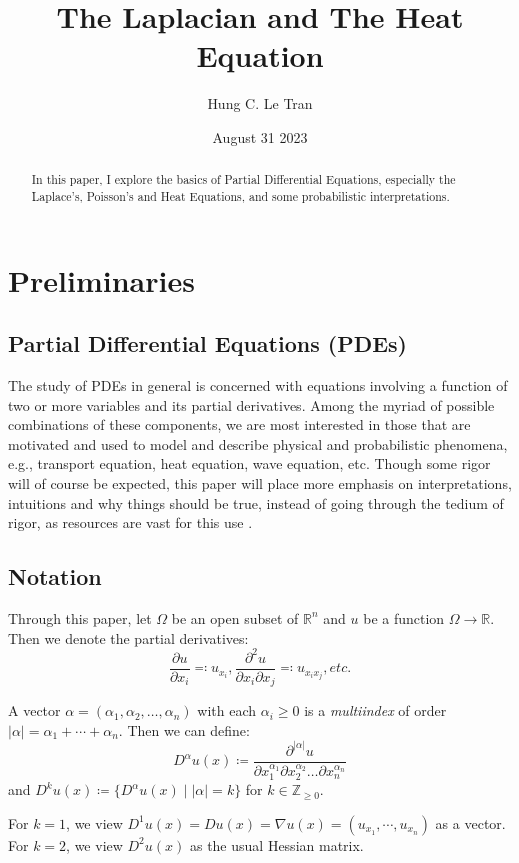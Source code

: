 \documentclass[openany, amssymb, psamsfonts]{amsart}
\title{The Laplacian and The Heat Equation}
\author{Hung C. Le Tran}
\date{August 31 2023}
\theoremstyle{definition}
\numberwithin{equation}{section}
\newcommand{\bbr}{\mathbb{R}}
\newcommand{\bbz}{\mathbb{Z}}
\begin{document}
\begin{abstract}
    In this paper, I explore the basics of Partial Differential Equations, especially the Laplace's, Poisson's and Heat Equations, and some probabilistic interpretations. 
\end{abstract}

\maketitle

\tableofcontents

\section{Preliminaries}
\subsection{Partial Differential Equations (PDEs)}
The study of PDEs in general is concerned with equations involving a function of two or more variables and its partial derivatives. Among the myriad of possible combinations of these components, we are most interested in those that are motivated and used to model and describe physical and probabilistic phenomena, e.g., transport equation, heat equation, wave equation, etc. Though some rigor will of course be expected, this paper will place more emphasis on interpretations, intuitions and why things should be true, instead of going through the tedium of rigor, as resources are vast for this use \cite{Evans}.
\subsection{Notation}
Through this paper, let $\Omega$ be an open subset of $\bbr^n$ and $u$ be a function $\Omega \to \bbr$. Then we denote the partial derivatives: \[
    \dfrac{\partial u}{\partial x_i}\eqqcolon u_{x_i},
    \dfrac{\partial^2 u}{\partial x_i \partial x_j}\eqqcolon u_{x_ix_j}, etc.
\]

A vector $\alpha = (\alpha_1, \alpha_2, \dots, \alpha_n)$ with each $ \alpha_i \geq 0 $ is a \textit{multiindex} of order $|\alpha| = \alpha_1 + \cdots + \alpha_n$. Then we can define: \[
    D^\alpha u(x) \coloneqq \dfrac{\partial^{|\alpha|} u}{\partial x_1^{\alpha_1} \partial x_2^{\alpha_2} \dots \partial x_n^{\alpha_n}}
\]
and $D^k u(x) \coloneqq \{D^\alpha u(x) \mid |\alpha| = k\}$ for $k \in \bbz_{\geq 0}$.

For $k = 1$, we view $D^1 u(x) = Du(x) = \nabla u(x) = (u_{x_1}, \cdots, u_{x_n})$ as a vector. For $k = 2$, we view $D^2 u(x)$ as the usual Hessian matrix.
\end{document}
